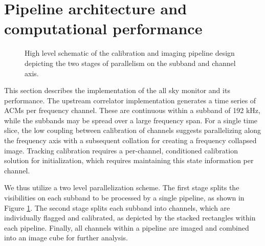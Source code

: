 \documentclass[referee]{aa}
\begin{document}
\section{\label{sec:Computational-performance}Pipeline architecture and computational performance}
\begin{figure}[tbh]
\caption{\label{fig:pipeline}  High  level  schematic  of  the  calibration  and
  imaging pipeline design depicting the two stages of parallelism on the subband
  and channel axis.}
\end{figure}

This  section  describes the  implementation  of the  all  sky  monitor and  its
performance. The  upstream correlator implementation generates a  time series of
ACMs per  frequency channel. These are  continuous within a subband  of 192 kHz,
while  the subbands may  be spread  over a  large frequency  span. For  a single
time slice,   the  low   coupling  between   calibration  of   channels  suggests
parallelizing along the frequency axis with a subsequent collation for creating
a  frequency  collapsed image.   Tracking  calibration  requires a  per-channel,
conditioned calibration solution  for initialization, which requires maintaining
this state information per channel. 

We thus utilize  a two level parallelization scheme. The  first stage splits the
visibilities on each  subband to be processed by a single  pipeline, as shown in
Figure \ref{fig:pipeline}.   The second stage splits each  subband into channels,
which  are  individually  flagged   and  calibrated,  as depicted  by  the  stacked
rectangles within  each pipeline.  Finally,  all channels within a  pipeline are
imaged and combined into an image cube for further analysis.
\end{document}
